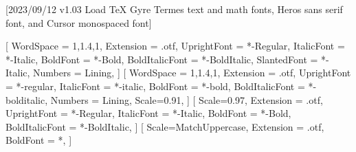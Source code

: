 
[2023/09/12 v1.03 Load TeX Gyre Termes text and math fonts, Heros sans serif font, and Cursor monospaced font]

%
%
\ifpdftex
	\RequirePackage[T1]{fontenc}	
	\RequirePackage{bm}
\else
    \RequirePackage[warnings-off={mathtools-colon,mathtools-overbracket}]{unicode-math}
    \setmainfont{TeXGyreTermesX}[%
		WordSpace = {1,1.4,1},
    	Extension = .otf,
    	UprightFont = *-Regular,
    	ItalicFont = *-Italic,
    	BoldFont = *-Bold,
    	BoldItalicFont = *-BoldItalic,
		SlantedFont = *-Italic,
		Numbers = Lining,
	]
    \setsansfont{texgyreheros}[%
		WordSpace = {1,1.4,1},
		Extension = .otf,
    	UprightFont = *-regular,
    	ItalicFont = *-italic,
    	BoldFont = *-bold,
    	BoldItalicFont = *-bolditalic,
		Numbers = Lining,
    	Scale=0.91,%
	]        
   \setmonofont{texgyrecursor}[%
        Scale=0.97,
        Extension = .otf,
        UprightFont = *-Regular,
        ItalicFont = *-Italic,
        BoldFont = *-Bold, 
    	BoldItalicFont = *-BoldItalic,
    ]             
    [%
    	Scale=MatchUppercase,
    	Extension = .otf,
		BoldFont = *, %
    ]
    \newcommand*{\FRAC}[1]{{\addfontfeature{Fractions=On}#1}}%
\fi

